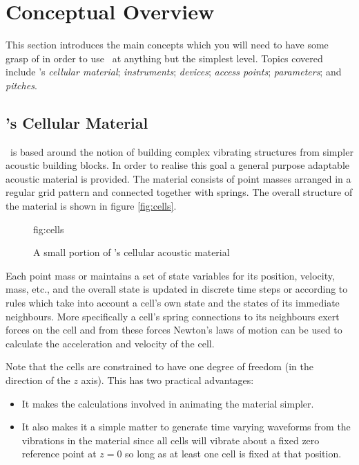 \chapter{Conceptual Overview}
\label{section:conceptual_overview}
This section introduces the main concepts which you will need to have
some grasp of in order to use \tao\ at anything but the simplest level.
Topics covered include \tao's \emph{cellular material}; \emph{instruments}; 
\emph{devices}; \emph{access points}; \emph{parameters}; and \emph{pitches}.

\section{\tao's Cellular Material}
\label{section:cellular_material}

\tao\ is based around the notion of building complex vibrating structures
from simpler acoustic building blocks. In order to realise this goal 
a general purpose adaptable acoustic material is provided. The material
consists of point masses arranged in a regular grid pattern and connected
together with springs. The overall structure of the material is shown in
figure \ref{fig:cells}. 

\begin{figure}[htb]
  \begin{Label}{fig:cells}
    \begin{center}
    \end{center}
    \caption{A small portion of \tao's cellular acoustic material}
  \end{Label}
\end{figure}

Each point mass or  maintains a set of state variables for
its position, velocity, mass, etc., and the overall state is updated in
discrete time steps or  according to rules which take into
account a cell's own state and the states of its immediate neighbours.
More specifically a cell's spring connections to its neighbours exert
forces on the cell and from these forces Newton's laws of motion can
be used to calculate the acceleration and velocity of the cell.

Note that the cells are constrained to have one degree of freedom (in the
direction of the $z$ axis). This has two practical advantages:

\begin{itemize}
\item It makes the calculations involved in animating the material simpler.
\item It also makes it a simple matter to generate time varying waveforms
from the vibrations in the material since all cells will vibrate about a
fixed zero reference point at $z=0$ so long as at least one cell
is fixed at that position.
\end{itemize}

